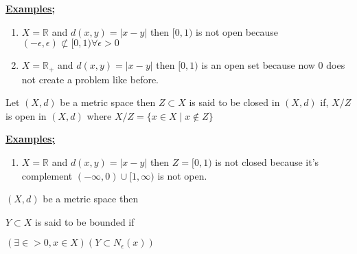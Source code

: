 \documentclass[12pt,a4paper]{article}
\begin{document}
\underline{\textbf{Examples;}}
\begin{enumerate}
    \item \(X=\mathbb{R}\) and \(d(x,y)=|x-y|\) then \([0,1)\) is not open because \((-\epsilon,\epsilon) \not\subset [0,1) \forall \epsilon > 0\)  
    \item \(X=\mathbb{R}_{+}\) and \(d(x,y)=|x-y|\) then \([0,1)\) is an open set because now \(0\) does not create a problem like before.       
\end{enumerate}

Let \((X,d)\) be a metric space then \( Z \subset X\) is said to be closed in \((X,d)\) if, \(X/Z\) is open in \((X,d)\) where \(X/Z = \{ x \in X \mid x \notin Z\}\)

\textbf{\underline{Examples;}}
\begin{enumerate}
    \item \(X=\mathbb{R}\) and \(d(x,y)=|x-y|\) then \(Z=[0,1) \) is not closed because it's complement \((-\infty, 0) \cup [1, \infty)\) is not open.        
\end{enumerate}
    
\((X, d)\) be a metric space then

\(Y \subset X\) is said to be bounded if

 \((\exists \in>0, x \in X)\left(Y \subset N_\epsilon(x)\right)\)

    
\end{document}
